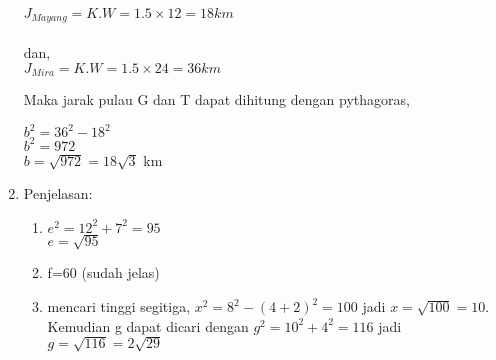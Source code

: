 \documentclass[12pt,a4paper]{article}
\begin{document}
\begin{enumerate}
		$J_{Mayang}=K.W=1.5 \times 12= 18 km$\\
		\\
		dan,\\
		$J_{Mira}=K.W=1.5 \times 24= 36 km$
		
		Maka jarak pulau G dan T dapat dihitung dengan pythagoras,
		
		$b^2=36^2-18^2$\\
		$b^2=972$\\
		$b=\sqrt{972}=18\sqrt{3}$ km
		
		\item Penjelasan:
		\begin{enumerate}
			\item $e^2=12^2+7^2=95$\\
				  $e=\sqrt{95}$
			\item f=60 (sudah jelas)
			\item mencari tinggi segitiga, $x^2=8^2-(4+2)^2=100$ jadi $x=\sqrt{100}=10$. Kemudian g dapat dicari dengan $g^2=10^2+4^2=116$ jadi $g=\sqrt{116}=2\sqrt{29}$ 
		\end{enumerate}
	\end{enumerate}
\end{document}
